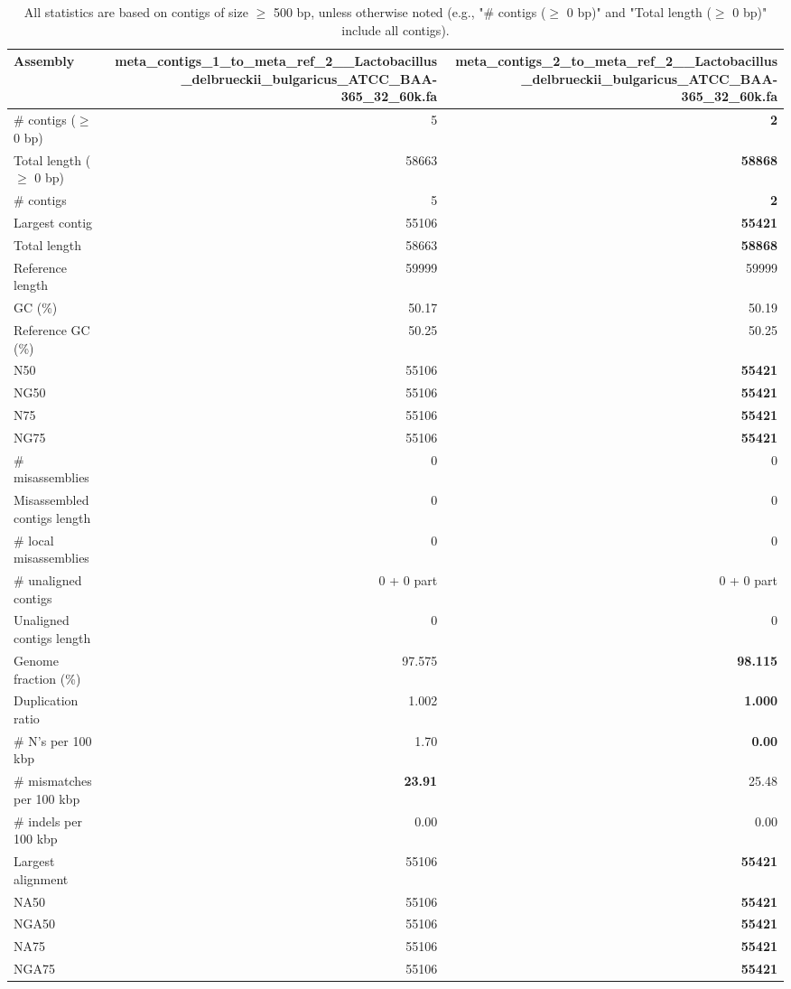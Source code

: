 \documentclass[12pt,a4paper]{article}
\begin{document}
\begin{table}[ht]
\begin{center}
\caption{All statistics are based on contigs of size $\geq$ 500 bp, unless otherwise noted (e.g., "\# contigs ($\geq$ 0 bp)" and "Total length ($\geq$ 0 bp)" include all contigs).}
\begin{tabular}{|l*{2}{|r}|}
\hline
Assembly & meta\_contigs\_1\_to\_meta\_ref\_2\_\_Lactobacillus\_delbrueckii\_bulgaricus\_ATCC\_BAA-365\_32\_60k.fa & meta\_contigs\_2\_to\_meta\_ref\_2\_\_Lactobacillus\_delbrueckii\_bulgaricus\_ATCC\_BAA-365\_32\_60k.fa \\ \hline
\# contigs ($\geq$ 0 bp) & 5 & {\bf 2} \\ \hline
Total length ($\geq$ 0 bp) & 58663 & {\bf 58868} \\ \hline
\# contigs & 5 & {\bf 2} \\ \hline
Largest contig & 55106 & {\bf 55421} \\ \hline
Total length & 58663 & {\bf 58868} \\ \hline
Reference length & 59999 & 59999 \\ \hline
GC (\%) & 50.17 & 50.19 \\ \hline
Reference GC (\%) & 50.25 & 50.25 \\ \hline
N50 & 55106 & {\bf 55421} \\ \hline
NG50 & 55106 & {\bf 55421} \\ \hline
N75 & 55106 & {\bf 55421} \\ \hline
NG75 & 55106 & {\bf 55421} \\ \hline
\# misassemblies & 0 & 0 \\ \hline
Misassembled contigs length & 0 & 0 \\ \hline
\# local misassemblies & 0 & 0 \\ \hline
\# unaligned contigs & 0 + 0 part & 0 + 0 part \\ \hline
Unaligned contigs length & 0 & 0 \\ \hline
Genome fraction (\%) & 97.575 & {\bf 98.115} \\ \hline
Duplication ratio & 1.002 & {\bf 1.000} \\ \hline
\# N's per 100 kbp & 1.70 & {\bf 0.00} \\ \hline
\# mismatches per 100 kbp & {\bf 23.91} & 25.48 \\ \hline
\# indels per 100 kbp & 0.00 & 0.00 \\ \hline
Largest alignment & 55106 & {\bf 55421} \\ \hline
NA50 & 55106 & {\bf 55421} \\ \hline
NGA50 & 55106 & {\bf 55421} \\ \hline
NA75 & 55106 & {\bf 55421} \\ \hline
NGA75 & 55106 & {\bf 55421} \\ \hline
\end{tabular}
\end{center}
\end{table}
\end{document}
